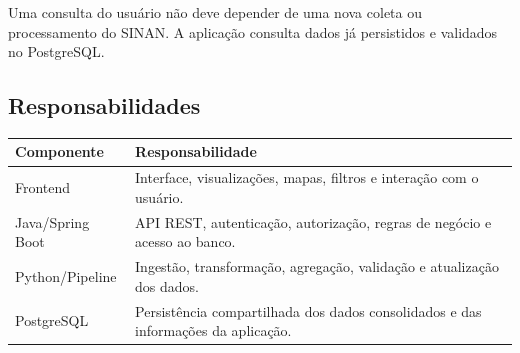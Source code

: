 \begin{regra}
Uma consulta do usuário não deve depender de uma nova coleta ou processamento do SINAN. A aplicação consulta dados já persistidos e validados no PostgreSQL.
\end{regra}

\subsection{Responsabilidades}

\begin{tabularx}{\textwidth}{@{}p{3.2cm}X@{}}
\toprule
\textbf{Componente} & \textbf{Responsabilidade} \\
\midrule
Frontend & Interface, visualizações, mapas, filtros e interação com o usuário. \\
Java/Spring Boot & API REST, autenticação, autorização, regras de negócio e acesso ao banco. \\
Python/Pipeline & Ingestão, transformação, agregação, validação e atualização dos dados. \\
PostgreSQL & Persistência compartilhada dos dados consolidados e das informações da aplicação. \\
\bottomrule
\end{tabularx}
